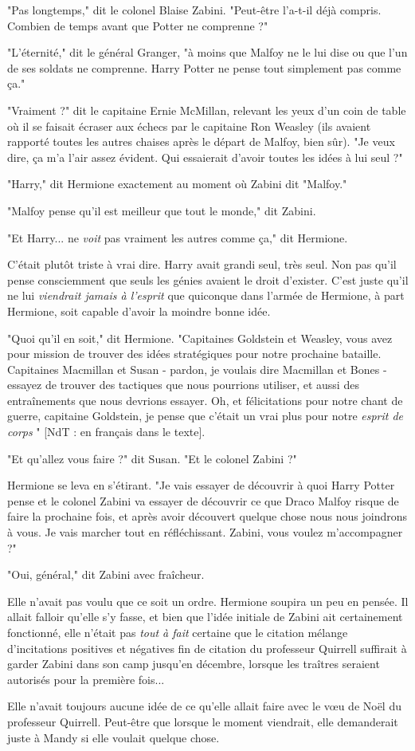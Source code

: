 "Pas longtemps," dit le colonel Blaise Zabini. "Peut-être l'a-t-il déjà compris. Combien de temps avant que Potter ne comprenne ?"

"L'éternité," dit le général Granger, "à moins que Malfoy ne le lui dise ou que l'un de ses soldats ne comprenne. Harry Potter ne pense tout simplement pas comme ça."

"Vraiment ?" dit le capitaine Ernie McMillan, relevant les yeux d'un coin de table où il se faisait écraser aux échecs par le capitaine Ron Weasley (ils avaient rapporté toutes les autres chaises après le départ de Malfoy, bien sûr). "Je veux dire, ça m'a l'air assez évident. Qui essaierait d'avoir toutes les idées à lui seul ?"

"Harry," dit Hermione exactement au moment où Zabini dit "Malfoy."

"Malfoy pense qu'il est meilleur que tout le monde," dit Zabini.

"Et Harry... ne \emph{voit}  pas vraiment les autres comme ça," dit Hermione.

C'était plutôt triste à vrai dire. Harry avait grandi seul, très seul. Non pas qu'il pense consciemment que seuls les génies avaient le droit d'exister. C'est juste qu'il ne lui \emph{viendrait jamais à l'esprit}  que quiconque dans l'armée de Hermione, à part Hermione, soit capable d'avoir la moindre bonne idée.

"Quoi qu'il en soit," dit Hermione. "Capitaines Goldstein et Weasley, vous avez pour mission de trouver des idées stratégiques pour notre prochaine bataille. Capitaines Macmillan et Susan - pardon, je voulais dire Macmillan et Bones - essayez de trouver des tactiques que nous pourrions utiliser, et aussi des entraînements que nous devrions essayer. Oh, et félicitations pour notre chant de guerre, capitaine Goldstein, je pense que c'était un vrai plus pour notre \emph{esprit de corps} " [NdT : en français dans le texte].

"Et qu'allez vous faire ?" dit Susan. "Et le colonel Zabini ?"

Hermione se leva en s'étirant. "Je vais essayer de découvrir à quoi Harry Potter pense et le colonel Zabini va essayer de découvrir ce que Draco Malfoy risque de faire la prochaine fois, et après avoir découvert quelque chose nous nous joindrons à vous. Je vais marcher tout en réfléchissant. Zabini, vous voulez m'accompagner ?"

"Oui, général," dit Zabini avec fraîcheur.

Elle n'avait pas voulu que ce soit un ordre. Hermione soupira un peu en pensée. Il allait falloir qu'elle s'y fasse, et bien que l'idée initiale de Zabini ait certainement fonctionné, elle n'était pas \emph{tout à fait}  certaine que le citation mélange d'incitations positives et négatives fin de citation du professeur Quirrell suffirait à garder Zabini dans son camp jusqu'en décembre, lorsque les traîtres seraient autorisés pour la première fois...

Elle n'avait toujours aucune idée de ce qu'elle allait faire avec le vœu de Noël du professeur Quirrell. Peut-être que lorsque le moment viendrait, elle demanderait juste à Mandy si elle voulait quelque chose.

